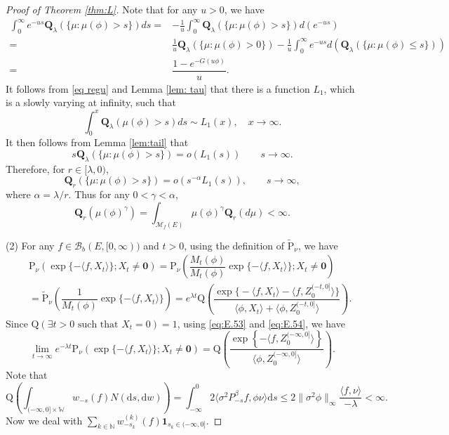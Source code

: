 \documentclass[12pt,a4paper]{amsart}
\numberwithin{equation}{section}
\theoremstyle{plain}
\theoremstyle{definition}
\theoremstyle{remark}
\begin{document}
\begin{proof}[Proof of Theorem \ref{thm:L}]
Note that for any $u>0$, we have
\begin{align}
\int_0^\infty e^{-us}{\mathbf Q}_\lambda(\{\mu: \mu(\phi)>s\})ds=&-\frac{1}{u}\int^\infty_0{\mathbf Q}_\lambda(\{\mu: \mu(\phi)>s\})d(e^{-us})\\
=&\frac{1}{u}{\mathbf Q}_\lambda(\{\mu: \mu(\phi)>0\})-\frac{1}{u}\int^\infty_0e^{-us}d({\mathbf Q}_\lambda(\{\mu: \mu(\phi)\le s\}))\\
=&\dfrac{1-e^{-G(u\phi)}}{u}.
\end{align}
It follows from  \eqref{eq regu} and Lemma \ref{lem: tau} that there is a function $L_1$, which is a slowly varying at infinity, such that
$$\int^x_0{\mathbf Q}_\lambda(\mu(\phi)>s)ds\sim L_1(x),\quad x\to\infty.$$
It then follows from Lemma \ref{lem:tail} that
$$s{\mathbf Q}_\lambda(\{\mu: \mu(\phi)>s\})=o(L_1(s))\qquad s\to\infty.$$
Therefore, for $r\in[\lambda, 0)$,
\begin{equation}
{\mathbf Q}_r(\{\mu: \mu(\phi)>s\})=o(s^{-\alpha}L_1(s)),\qquad s\to\infty,
\end{equation}
where $\alpha=\lambda/r.$
Thus for any $0<\gamma<\alpha$,
\[
{\mathbf Q}_r\left(\mu(\phi)^{\gamma}\right)=\int_{{\mathcal M}_f(E)}\mu(\phi)^\gamma\mathbf Q_r(d\mu)<\infty.
\]

(2)
For any $f\in\mathcal B_b(E, [0, \infty))$ and $t>0$,  using the definition of $\widetilde{\mathrm P}_\nu$, we have
\begin{eqnarray*}
&&\mathrm P_\nu\left(\exp\{-\langle f, X_t\rangle \}; X_t\neq \mathbf 0\right)
=\mathrm P_\nu\left(\dfrac{M_t(\phi)}{M_t(\phi)}\exp\{-\langle f, X_t\rangle \};X_t\neq \mathbf 0\right)\\
&&=\widetilde{\mathrm P}_\nu\left(\dfrac{1}{M_t(\phi)}\exp\{-\langle f, X_t\rangle \}\right)
=e^{\lambda t}\mathrm Q\left(\dfrac{\exp\Big\{-\langle f, X_t\rangle -\langle f,  Z_0^{(-t, 0]}\rangle\Big \}}{\langle\phi, X_t\rangle +\langle\phi,  Z_0^{(-t, 0]}\rangle }\right).
\end{eqnarray*}
Since ${\mathrm Q}( \exists t>0 \mbox{ such that }X_t=0)=1$,
using  \eqref{eq:E.53} and  \eqref{eq:E.54}, we have
\begin{equation}\label{e:new}
\lim_{t\to\infty}e^{-\lambda t}\mathrm P_\nu\left(\exp\{-\langle f, X_t\rangle \};X_t\neq \mathbf 0\right)={\mathrm Q}\left(\dfrac{\exp\left\{-\langle f,Z_0^{(-\infty, 0]}\rangle \right\}}{\langle \phi, Z_0^{(-\infty, 0]}\rangle}\right).
\end{equation}
Note that
\[
\mathrm Q\left(\int_{(-\infty, 0]\times \mathbb W}w_{-s}(f)N(\mathrm ds, \mathrm dw)\right)=
\int^0_{-\infty}2\langle \sigma^2 P^{\beta}_{-s}f,\phi\nu\rangle \mathrm ds
\leq 2\|\sigma^2\phi\|_\infty\dfrac{\langle f,\nu\rangle }{-\lambda}<\infty.
\]
Now we deal with $\sum_{k\in\mathbb N}w^{(k)}_{-s_k}(f)\mathbf 1_{s_k\in (-\infty, 0]}$.


\end{proof}
\end{document}
